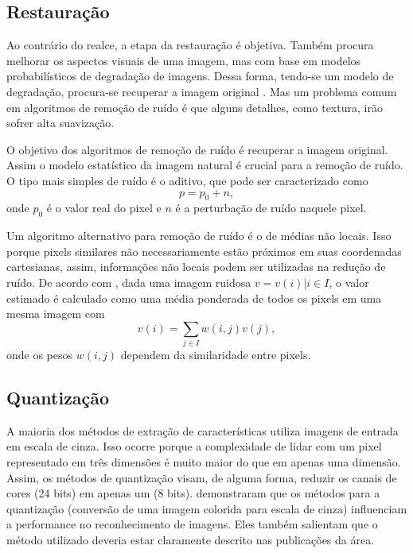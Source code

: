 \enlargethispage{\baselineskip}
\subsection{Restauração}

Ao contrário do realce, a etapa da restauração é objetiva. Também procura melhorar os aspectos visuais de uma imagem, mas com base em modelos probabilísticos de degradação de imagens. Dessa forma, tendo-se um modelo de degradação, procura-se recuperar a imagem original \cite{Gonzalez2007}. Mas um problema comum em algoritmos de remoção de ruído é que alguns detalhes, como textura, irão sofrer alta suavização.

O objetivo dos algoritmos de remoção de ruído é recuperar a imagem original. Assim o modelo estatístico da imagem natural é crucial para a remoção de ruído. O tipo mais simples de ruído  é o aditivo, que pode ser caracterizado como
\begin{equation*}
p = p_0 + n,
\end{equation*}
\noindent onde $p_0$ é o valor real do pixel e $n$ é a perturbação de ruído naquele pixel.


Um algoritmo alternativo para remoção de ruído é o de médias não locais. Isso porque pixels similares não necessariamente estão próximos em suas coordenadas cartesianas, assim, informações não locais podem ser utilizadas na redução de ruído. De acordo com , dada uma imagem ruidosa $v = {v(i) | i \in I}$, o valor estimado é calculado como uma média ponderada de todos os pixels em uma mesma imagem com
\begin{equation*}
v(i)= \sum_{j \in I} w(i, j)v(j),
\end{equation*}
\noindent onde os pesos $w(i, j)$ dependem da similaridade entre pixels.

\subsection{Quantização}
\label{sec:quantizacao}

A maioria dos métodos de extração de características utiliza imagens de entrada em escala de cinza. Isso ocorre porque a complexidade de lidar com um pixel representado em três dimensões é muito maior do que em apenas uma dimensão. Assim, os métodos de quantização visam, de alguma forma, reduzir os canais de cores (24 bits) em apenas um (8 bits).  demonstraram que os métodos para a quantização (conversão de uma imagem colorida para escala de cinza) influenciam a performance no reconhecimento de imagens. Eles também salientam que o método utilizado deveria estar claramente descrito nas publicações da área.

